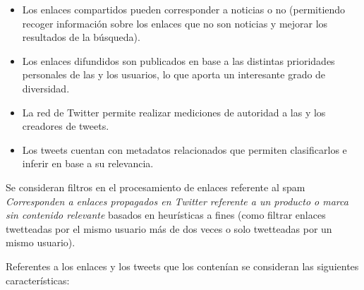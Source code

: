   \begin{itemize}
	\item Los enlaces compartidos pueden corresponder a noticias o no (permitiendo recoger información sobre los enlaces que no son noticias y mejorar los resultados de la búsqueda).
	\item Los enlaces difundidos son publicados en base a las distintas prioridades personales de las y los usuarios, lo que aporta un interesante grado de diversidad.
	\item La red de Twitter permite realizar mediciones de autoridad a las y los creadores de tweets.
	\item Los tweets cuentan con metadatos relacionados que permiten clasificarlos e inferir en base a su relevancia.
  \end{itemize}
  
 Se consideran filtros en el procesamiento de enlaces referente al spam \emph{ Corresponden a enlaces propagados en Twitter referente a un producto o marca sin contenido relevante} basados en heurísticas a fines (como filtrar enlaces twetteadas por el mismo usuario más de dos veces o solo twetteadas por un mismo usuario).
 
 Referentes a los enlaces y los tweets que los contenían se consideran las siguientes características:
  
